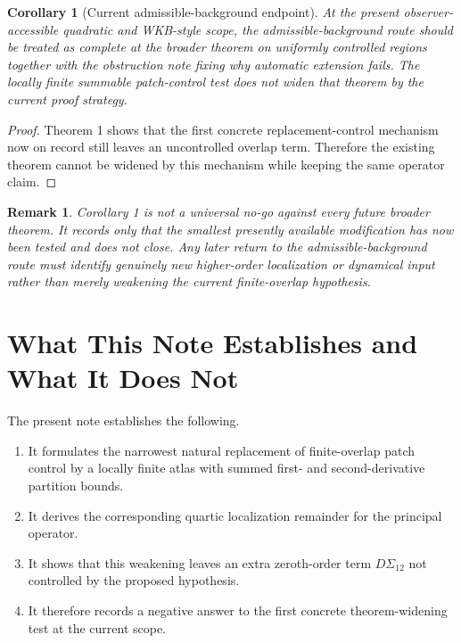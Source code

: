 \documentclass[11pt]{article}
\newtheorem{remark}{Remark}
\newtheorem{corollary}{Corollary}
\begin{document}
\begin{corollary}[Current admissible-background endpoint]
At the present observer-accessible quadratic and WKB-style scope, the admissible-background route should be treated as complete at the broader theorem on uniformly controlled regions together with the obstruction note fixing why automatic extension fails. The locally finite summable patch-control test does not widen that theorem by the current proof strategy.
\end{corollary}

\begin{proof}
Theorem 1 shows that the first concrete replacement-control mechanism now on record still leaves an uncontrolled overlap term. Therefore the existing theorem cannot be widened by this mechanism while keeping the same operator claim.
\end{proof}

\begin{remark}
Corollary 1 is not a universal no-go against every future broader theorem. It records only that the smallest presently available modification has now been tested and does not close. Any later return to the admissible-background route must identify genuinely new higher-order localization or dynamical input rather than merely weakening the current finite-overlap hypothesis.
\end{remark}

\section{What This Note Establishes and What It Does Not}

The present note establishes the following.
\begin{enumerate}
    \item It formulates the narrowest natural replacement of finite-overlap patch control by a locally finite atlas with summed first- and second-derivative partition bounds.
    \item It derives the corresponding quartic localization remainder for the principal operator.
    \item It shows that this weakening leaves an extra zeroth-order term \(D\Sigma_{12}\) not controlled by the proposed hypothesis.
    \item It therefore records a negative answer to the first concrete theorem-widening test at the current scope.
\end{enumerate}
\end{document}
